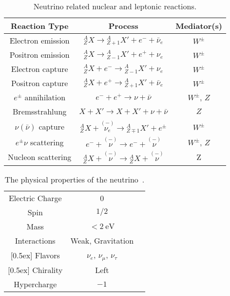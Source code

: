 \begin{table}[ht]
\centering
\setlength\tabcolsep{10pt}
 \begin{tabular}{ c  c  c}
 \hline
 \hline
 Reaction Type & Process & Mediator(s)   \\
 \hline
 Electron emission & ${}^A_Z X \to {}^A_{Z+1}X' + e^- +\bar \nu_e$ & $W^{\pm}$  \\
 Positron emission & ${}^A_Z X \to {}^A_{Z-1}X' + e^+ + \nu_e$ & $W^{\pm}$  \\
 Electron capture & ${}^A_Z X + e^- \to {}^A_{Z-1}X'  + \nu_e$ &  $W^{\pm}$ \\
 Positron capture & ${}^A_Z X + e^+ \to {}^A_{Z+1}X'  + \bar\nu_e$ &  $W^{\pm}$ \\
 [0.5ex]
 \hline

 $e^{\pm}$ annihilation &  $e^- + e^+  \to \nu + \bar\nu $  & $W^{\pm}$, $Z$ \\
 Bremsstrahlung & $X+X' \to X + X' + \nu + \bar\nu$ & $Z$ \\
 [0.5ex]
 \hline

  $\nu (\bar\nu)$ capture & ${}^A_{Z}X + \overset{(-)}{\nu_e} \to {}^A_{Z\mp 1}X' + e^\pm $ & $W^{\pm}$\\
  [1ex]
 \hline
 $e^\pm\nu$ scattering & $e^- + \overset{(-)}{\nu} \to e^- + \overset{(-)}{\nu} $ &  $W^{\pm}$, $Z$ \\
 Nucleon scattering & $ {}^A_Z X + \overset{(-)}{\nu} \to {}^A_Z X + \overset{(-)}{\nu} $ &  Z\\
 [0.5ex]
 \hline
 \hline
 \end{tabular}
 \caption{Neutrino related nuclear and leptonic reactions.}
\label{table:Neutrino_Reactions}
\end{table}

\begin{table}[ht]
\centering
\setlength\tabcolsep{15pt}
 \begin{tabular}{ c  c  c}
 \hline
 \hline
  Electric Charge & 0\\
 [0.5ex]
  Spin & $1/2$ \\
 [0.5ex]
 Mass & $<2~\mathrm{eV}$ \\
 [0.5ex]
 Interactions & Weak, Gravitation  \\
 [0.5ex]
 Flavors & $\nu_e$, $\nu_\mu$, $\nu_\tau$ \\
 [0.5ex]
 Chirality & Left \\
 [0.5ex]
 Hypercharge & $-1$ \\
 [0.5ex]
 \hline
 \hline
 \end{tabular}
 \caption{The physical properties of the neutrino~\cite{Patrignani:2016xqp}.}
\label{table:neutrino-properties}
\end{table}

